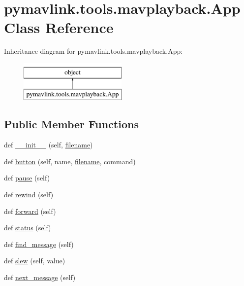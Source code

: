 \hypertarget{classpymavlink_1_1tools_1_1mavplayback_1_1App}{}\section{pymavlink.\+tools.\+mavplayback.\+App Class Reference}
\label{classpymavlink_1_1tools_1_1mavplayback_1_1App}
Inheritance diagram for pymavlink.\+tools.\+mavplayback.\+App\+:\begin{figure}[H]
\begin{center}
\leavevmode
\includegraphics[height=2.000000cm]{classpymavlink_1_1tools_1_1mavplayback_1_1App}
\end{center}
\end{figure}
\subsection*{Public Member Functions}
\begin{DoxyCompactItemize}
\item 
def \mbox{\hyperlink{classpymavlink_1_1tools_1_1mavplayback_1_1App_a5ee472eff5d8d9bb42bd20337e7a0d18}{\+\_\+\+\_\+init\+\_\+\+\_\+}} (self, \mbox{\hyperlink{namespacepymavlink_1_1tools_1_1mavplayback_af58db67c35618bb32480880bf6cc83d3}{filename}})
\item 
def \mbox{\hyperlink{classpymavlink_1_1tools_1_1mavplayback_1_1App_aada9c02d6fe0a6cf30eca06a9cc4b01b}{button}} (self, name, \mbox{\hyperlink{namespacepymavlink_1_1tools_1_1mavplayback_af58db67c35618bb32480880bf6cc83d3}{filename}}, command)
\item 
def \mbox{\hyperlink{classpymavlink_1_1tools_1_1mavplayback_1_1App_a069dac2f5a8086736d8691779b409cda}{pause}} (self)
\item 
def \mbox{\hyperlink{classpymavlink_1_1tools_1_1mavplayback_1_1App_a414c5e703f584943391a3f0dedc1401b}{rewind}} (self)
\item 
def \mbox{\hyperlink{classpymavlink_1_1tools_1_1mavplayback_1_1App_a09ac8360859a9b2e685612b6504fb951}{forward}} (self)
\item 
def \mbox{\hyperlink{classpymavlink_1_1tools_1_1mavplayback_1_1App_ab09676f5e32cc2023ce9bf476418ee21}{status}} (self)
\item 
def \mbox{\hyperlink{classpymavlink_1_1tools_1_1mavplayback_1_1App_a51fb5db450ed3c0988122799a5cf2727}{find\+\_\+message}} (self)
\item 
def \mbox{\hyperlink{classpymavlink_1_1tools_1_1mavplayback_1_1App_a146a9c59d441295f276aa2bab3b8aa63}{slew}} (self, value)
\item 
def \mbox{\hyperlink{classpymavlink_1_1tools_1_1mavplayback_1_1App_a62a2ef2e9a935c44fcb7348ad4e32e77}{next\+\_\+message}} (self)
\end{DoxyCompactItemize}
